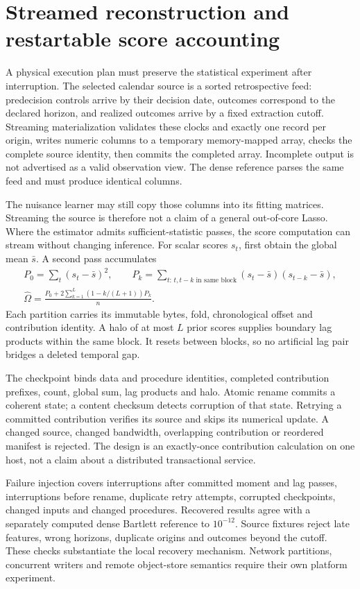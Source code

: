 \section{Streamed reconstruction and restartable score accounting}
\label{c7:restartable}
A physical execution plan must preserve the statistical experiment after
interruption. The selected calendar source is a sorted retrospective feed:
predecision controls arrive by their decision date, outcomes correspond to
the declared horizon, and realized outcomes arrive by a fixed extraction
cutoff. Streaming materialization validates these clocks and exactly one
record per origin, writes numeric columns to a temporary memory-mapped array,
checks the complete source identity, then commits the completed array.
Incomplete output is not advertised as a valid observation view. The dense
reference parses the same feed and must produce identical columns.

The nuisance learner may still copy those columns into its fitting matrices.
Streaming the source is therefore not a claim of a general out-of-core Lasso.
Where the estimator admits sufficient-statistic passes, the score computation
can stream without changing inference. For scalar scores $s_t$, first obtain
the global mean $\bar s$. A second pass accumulates
\begin{align*}
 P_0=\sum_t(s_t-\bar s)^2,\qquad
 P_k=\sum_{t:\,t,t-k\text{ in same block}}
               (s_t-\bar s)(s_{t-k}-\bar s),\\
 \widehat\Omega=\frac{P_0+2\sum_{k=1}^{L}(1-k/(L+1))P_k}{n}.
\end{align*}
Each partition carries its immutable bytes, fold, chronological offset and
contribution identity. A halo of at most $L$ prior scores supplies boundary
lag products within the same block. It resets between blocks, so no artificial
lag pair bridges a deleted temporal gap.

The checkpoint binds data and procedure identities, completed contribution
prefixes, count, global sum, lag products and halo. Atomic rename commits a
coherent state; a content checksum detects corruption of that state. Retrying
a committed contribution verifies its source and skips its numerical update.
A changed source, changed bandwidth, overlapping contribution or reordered
manifest is rejected. The design is an exactly-once contribution calculation
on one host, not a claim about a distributed transactional service.

Failure injection covers interruptions after committed moment and lag passes,
interruptions before rename, duplicate retry attempts, corrupted checkpoints,
changed inputs and changed procedures. Recovered results agree with a separately
computed dense Bartlett reference to $10^{-12}$. Source fixtures reject late
features, wrong horizons, duplicate origins and outcomes beyond the cutoff.
These checks substantiate the local recovery mechanism. Network partitions,
concurrent writers and remote object-store semantics require their own platform
experiment.

